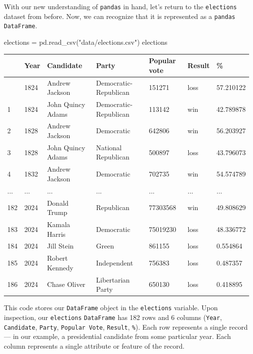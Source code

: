 \documentclass[
  letterpaper,
  DIV=11,
  numbers=noendperiod]{scrreprt}
\newenvironment{Shaded}{\begin{snugshade}}{\end{snugshade}}
\newcommand{\NormalTok}[1]{\textcolor[rgb]{0.00,0.23,0.31}{#1}}
\newcommand{\OperatorTok}[1]{\textcolor[rgb]{0.37,0.37,0.37}{#1}}
\newcommand{\StringTok}[1]{\textcolor[rgb]{0.13,0.47,0.30}{#1}}
\begin{document}
With our new understanding of \texttt{pandas} in hand, let's return to
the \texttt{elections} dataset from before. Now, we can recognize that
it is represented as a \texttt{pandas} \texttt{DataFrame}.

\begin{Shaded}
\begin{Highlighting}[]
\NormalTok{elections }\OperatorTok{=}\NormalTok{ pd.read\_csv(}\StringTok{"data/elections.csv"}\NormalTok{)}
\NormalTok{elections}
\end{Highlighting}
\end{Shaded}

\begin{longtable}[]{@{}lllllll@{}}
\toprule\noalign{}
& Year & Candidate & Party & Popular vote & Result & \% \\
\midrule\noalign{}
\endhead
\bottomrule\noalign{}
\endlastfoot
0 & 1824 & Andrew Jackson & Democratic-Republican & 151271 & loss &
57.210122 \\
1 & 1824 & John Quincy Adams & Democratic-Republican & 113142 & win &
42.789878 \\
2 & 1828 & Andrew Jackson & Democratic & 642806 & win & 56.203927 \\
3 & 1828 & John Quincy Adams & National Republican & 500897 & loss &
43.796073 \\
4 & 1832 & Andrew Jackson & Democratic & 702735 & win & 54.574789 \\
... & ... & ... & ... & ... & ... & ... \\
182 & 2024 & Donald Trump & Republican & 77303568 & win & 49.808629 \\
183 & 2024 & Kamala Harris & Democratic & 75019230 & loss & 48.336772 \\
184 & 2024 & Jill Stein & Green & 861155 & loss & 0.554864 \\
185 & 2024 & Robert Kennedy & Independent & 756383 & loss & 0.487357 \\
186 & 2024 & Chase Oliver & Libertarian Party & 650130 & loss &
0.418895 \\
\end{longtable}

This code stores our \texttt{DataFrame} object in the \texttt{elections}
variable. Upon inspection, our \texttt{elections} \texttt{DataFrame} has
182 rows and 6 columns (\texttt{Year}, \texttt{Candidate},
\texttt{Party}, \texttt{Popular\ Vote}, \texttt{Result}, \texttt{\%}).
Each row represents a single record --- in our example, a presidential
candidate from some particular year. Each column represents a single
attribute or feature of the record.
\end{document}

